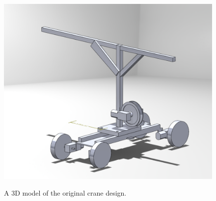 \documentclass[letterpaper, 12pt]{article}
\begin{document}
\begin{figure}[H]
    \centering
    \includegraphics{Crane_render_1.png}
    \label{fig:Crane_Render_1}
    \caption{A 3D model of the original crane design.}
\end{figure}
\end{document}

